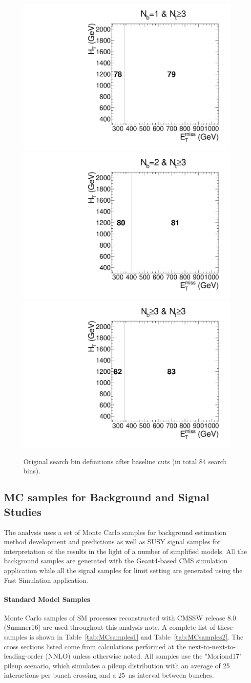 \begin{figure}[h]
\begin{center}
    \includegraphics[width=0.30\linewidth]{sections/mc4/EvtSelSBOpt/figures/poly_MT2_vs_met_6.pdf} 
    \includegraphics[width=0.30\linewidth]{sections/mc4/EvtSelSBOpt/figures/poly_MT2_vs_met_7.pdf} 
    \includegraphics[width=0.30\linewidth]{sections/mc4/EvtSelSBOpt/figures/poly_MT2_vs_met_8.pdf} \\
    \caption{Original search bin definitions after baseline cuts (in total 84 search bins). }
    \label{fig:SBXX}
  \end{center}
\end{figure}

\subsection{MC samples for Background and Signal Studies}
\label{sec:sm-mc}

The analysis uses a set of Monte Carlo samples for background estimation method
development and predictions as well as SUSY signal samples for interpretation
of the results in the light of a number of simplified models. All the
background samples are generated with the Geant4-based CMS simulation 
application while all the signal samples for limit setting are generated
using the Fast Simulation application.

\paragraph{Standard Model Samples}

Monte Carlo samples of SM processes reconstructed with CMSSW release 8.0 (Summer16) are used throughout this analysis note.
A complete list of these samples is shown in Table~\ref{tab:MCsamples1} and Table~\ref{tab:MCsamples2}. 
The cross sections listed come from calculations performed at the 
next-to-next-to-leading-order (NNLO) unless otherwise noted.
All samples use the "Moriond17" pileup scenario, which simulates a pileup distribution with an average of 25 interactions per bunch crossing and a 25~ns interval between bunches.


